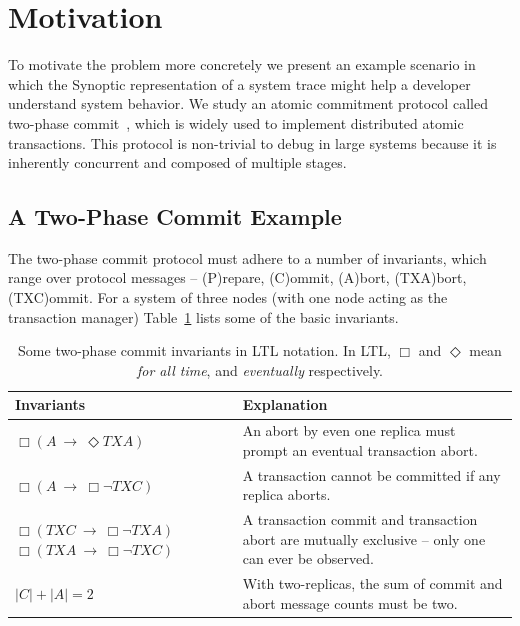 \section{Motivation}

To motivate the problem more concretely we present an example scenario
in which the Synoptic representation of a system trace might help a
developer understand system behavior. We study an atomic commitment
protocol called two-phase commit~\cite{TwoPhaseCommit}, which is
widely used to implement distributed atomic transactions. This
protocol is non-trivial to debug in large systems because it is
inherently concurrent and composed of multiple stages.


\subsection{A Two-Phase Commit Example}

The two-phase commit protocol must adhere to a number of invariants,
which range over protocol messages -- (P)repare, (C)ommit, (A)bort,
(TXA)bort, (TXC)ommit.  For a system of three nodes (with one node
acting as the transaction manager) Table~\ref{table:twopc_ex_invs}
lists some of the basic invariants.

\begin{table}[!t]
\begin{tabular}{p{3.3cm}p{3.9cm}}
  \textbf{Invariants} & \textbf{Explanation}\\
  \hline
  $\Box(\mathit{A}~\rightarrow~\Diamond{\mathit{TXA}})$ & An abort by
  even one replica must prompt an eventual transaction abort.\\
  \hline
  $\Box(\mathit{A}~\rightarrow~\Box{\neg{\mathit{TXC}}})$ & A
  transaction cannot be committed if any replica aborts.\\
  \hline
  $\Box(\mathit{TXC}~\rightarrow~\Box{\neg{\mathit{TXA}}})$
  $\Box(\mathit{TXA}~\rightarrow~\Box{\neg{\mathit{TXC}}})$ & A
  transaction commit and transaction abort are mutually exclusive --
  only one can ever be observed.\\
  \hline
  $|\mathit{C}| + |\mathit{A}| = 2$ & With two-replicas, the
  sum of commit and abort message counts must be two.\\
\end{tabular}

\caption{Some two-phase commit invariants in LTL
  notation. In LTL, $\Box$ and
  $\Diamond$ mean \emph{for all time}, and \emph{eventually}
  respectively.}

\label{table:twopc_ex_invs}
\end{table}

